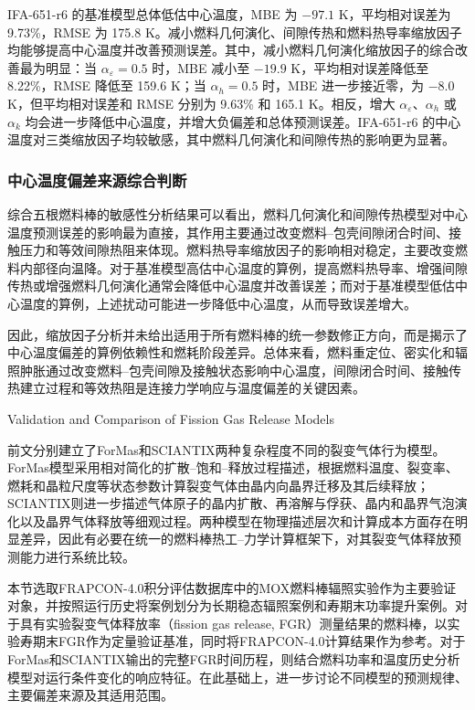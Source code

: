 IFA-651-r6 的基准模型总体低估中心温度，MBE 为 \(-97.1\) K，平均相对误差为 9.73\%，RMSE 为 175.8 K。减小燃料几何演化、间隙传热和燃料热导率缩放因子均能够提高中心温度并改善预测误差。其中，减小燃料几何演化缩放因子的综合改善最为明显：当 \(\alpha_{\varepsilon}=0.5\) 时，MBE 减小至 \(-19.9\) K，平均相对误差降低至 8.22\%，RMSE 降低至 159.6 K；当 \(\alpha_h=0.5\) 时，MBE 进一步接近零，为 \(-8.0\) K，但平均相对误差和 RMSE 分别为 9.63\% 和 165.1 K。相反，增大 \(\alpha_{\varepsilon}\)、\(\alpha_h\) 或 \(\alpha_k\) 均会进一步降低中心温度，并增大负偏差和总体预测误差。IFA-651-r6 的中心温度对三类缩放因子均较敏感，其中燃料几何演化和间隙传热的影响更为显著。

\subsubsection{中心温度偏差来源综合判断}

综合五根燃料棒的敏感性分析结果可以看出，燃料几何演化和间隙传热模型对中心温度预测误差的影响最为直接，其作用主要通过改变燃料--包壳间隙闭合时间、接触压力和等效间隙热阻来体现。燃料热导率缩放因子的影响相对稳定，主要改变燃料内部径向温降。对于基准模型高估中心温度的算例，提高燃料热导率、增强间隙传热或增强燃料几何演化通常会降低中心温度并改善误差；而对于基准模型低估中心温度的算例，上述扰动可能进一步降低中心温度，从而导致误差增大。

因此，缩放因子分析并未给出适用于所有燃料棒的统一参数修正方向，而是揭示了中心温度偏差的算例依赖性和燃耗阶段差异。总体来看，燃料重定位、密实化和辐照肿胀通过改变燃料--包壳间隙及接触状态影响中心温度，间隙闭合时间、接触传热建立过程和等效热阻是连接力学响应与温度偏差的关键因素。

{Validation and Comparison of Fission Gas Release Models}

前文分别建立了ForMas和SCIANTIX两种复杂程度不同的裂变气体行为模型。ForMas模型采用相对简化的扩散--饱和--释放过程描述，根据燃料温度、裂变率、燃耗和晶粒尺度等状态参数计算裂变气体由晶内向晶界迁移及其后续释放；SCIANTIX则进一步描述气体原子的晶内扩散、再溶解与俘获、晶内和晶界气泡演化以及晶界气体释放等细观过程。两种模型在物理描述层次和计算成本方面存在明显差异，因此有必要在统一的燃料棒热工--力学计算框架下，对其裂变气体释放预测能力进行系统比较。

本节选取FRAPCON-4.0积分评估数据库中的MOX燃料棒辐照实验作为主要验证对象，并按照运行历史将案例划分为长期稳态辐照案例和寿期末功率提升案例。对于具有实验裂变气体释放率（fission gas release, FGR）测量结果的燃料棒，以实验寿期末FGR作为定量验证基准，同时将FRAPCON-4.0计算结果作为参考。对于ForMas和SCIANTIX输出的完整FGR时间历程，则结合燃料功率和温度历史分析模型对运行条件变化的响应特征。在此基础上，进一步讨论不同模型的预测规律、主要偏差来源及其适用范围。

